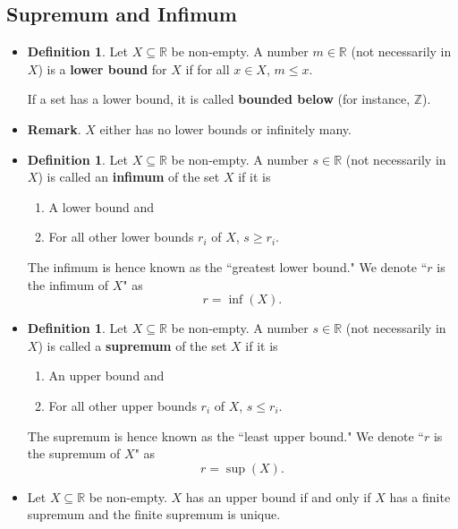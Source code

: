 \documentclass{article}
\newcommand{\Z}{\mathbb{Z}}
\newcommand{\R}{\mathbb{R}}
\newcommand{\?}{\stackrel{?}{=}}
\theoremstyle{definition} %
\newtheorem{definition}[subsection]{Definition} %
\begin{document}
\subsection{Supremum and Infimum}

\begin{itemize}
    \item[] 
    \begin{definition}
        Let $X \subseteq \R$ be non-empty. A number $m \in \R$ (not necessarily in $X$) is a \textbf{lower bound} for $X$ if for all $x \in X$, $m \leq x$.
    \end{definition}
    If a set has a lower bound, it is called \textbf{bounded below} (for instance, $\Z$).
    \item \textbf{Remark}. $X$ either has no lower bounds or infinitely many.
    \item[]
    \begin{definition}
        Let $X \subseteq \R$ be non-empty. A number $s \in \R$ (not necessarily in $X$) is called an \textbf{infimum} of the set $X$ if it is
    \begin{enumerate}[label=(\arabic*)]
        \item A lower bound and
        \item For all other lower bounds $r_i$ of $X$, $s \geq r_i$.
    \end{enumerate}
    The infimum is hence known as the ``greatest lower bound." We denote ``$r$ is the infimum of $X$" as
    $$r = \inf(X).$$
    \end{definition}
    \item[]
    \begin{definition}
        Let $X \subseteq \R$ be non-empty. A number $s \in \R$ (not necessarily in $X$) is called a \textbf{supremum} of the set $X$ if it is
    \begin{enumerate}[label=(\arabic*)]
        \item An upper bound and
        \item For all other upper bounds $r_i$ of $X$, $s \leq r_i$.
    \end{enumerate}
    The supremum is hence known as the ``least upper bound." We denote ``$r$ is the supremum of $X$" as
    $$r = \sup(X).$$
    \end{definition}
    \item[]
    \begin{theorem}
         Let $X \subseteq \R$ be non-empty. $X$ has an upper bound if and only if $X$ has a finite supremum and the finite supremum is unique.

\end{theorem}
\end{itemize}
\end{document}
